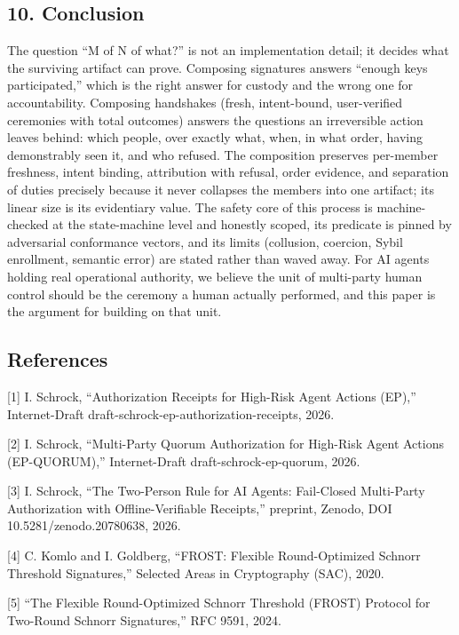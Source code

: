 \documentclass[
  11pt,
]{article}
\begin{document}
\subsection{10. Conclusion}\label{conclusion}

The question ``M of N of what?'' is not an implementation detail; it
decides what the surviving artifact can prove. Composing signatures
answers ``enough keys participated,'' which is the right answer for
custody and the wrong one for accountability. Composing handshakes
(fresh, intent-bound, user-verified ceremonies with total outcomes)
answers the questions an irreversible action leaves behind: which
people, over exactly what, when, in what order, having demonstrably seen
it, and who refused. The composition preserves per-member freshness,
intent binding, attribution with refusal, order evidence, and separation
of duties precisely because it never collapses the members into one
artifact; its linear size is its evidentiary value. The safety core of
this process is machine-checked at the state-machine level and honestly
scoped, its predicate is pinned by adversarial conformance vectors, and
its limits (collusion, coercion, Sybil enrollment, semantic error) are
stated rather than waved away. For AI agents holding real operational
authority, we believe the unit of multi-party human control should be
the ceremony a human actually performed, and this paper is the argument
for building on that unit.

\subsection{References}\label{references}

{[}1{]} I. Schrock, ``Authorization Receipts for High-Risk Agent Actions
(EP),'' Internet-Draft draft-schrock-ep-authorization-receipts, 2026.

{[}2{]} I. Schrock, ``Multi-Party Quorum Authorization for High-Risk
Agent Actions (EP-QUORUM),'' Internet-Draft draft-schrock-ep-quorum,
2026.

{[}3{]} I. Schrock, ``The Two-Person Rule for AI Agents: Fail-Closed
Multi-Party Authorization with Offline-Verifiable Receipts,'' preprint,
Zenodo, DOI 10.5281/zenodo.20780638, 2026.

{[}4{]} C. Komlo and I. Goldberg, ``FROST: Flexible Round-Optimized
Schnorr Threshold Signatures,'' Selected Areas in Cryptography (SAC),
2020.

{[}5{]} ``The Flexible Round-Optimized Schnorr Threshold (FROST)
Protocol for Two-Round Schnorr Signatures,'' RFC 9591, 2024.
\end{document}
